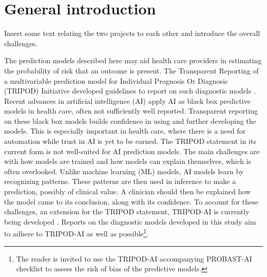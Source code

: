 \chapter{General introduction}\label{ch:general_introduction}

Insert some text relating the two projects to each other and introduce the overall challenges.

The prediction models described here may aid health care providers in estimating the probability of risk that an outcome is present.
The Transparent Reporting of a multivariable prediction model for Individual Prognosis Or Diagnosis (TRIPOD) Initiative developed guidelines to report on such diagnostic models \cite{Collins2015, Moons2015}.
Recent advances in artificial intelligence (AI) apply AI as black box predictive models in health care, often not sufficiently well reported.
Transparent reporting on these black box models builds confidence in using and further developing the models.
This is especially important in health care, where there is a need for automation while trust in AI is yet to be earned.
The TRIPOD statement in its current form is not well-suited for AI prediction models.
The main challenges are with how models are trained and how models can explain themselves, which is often overlooked.
Unlike machine learning (ML) models, AI models learn by recognizing patterns.
These patterns are then used in inference to make a prediction, possibly of clinical value.
A clinician should then be explained how the model came to its conclusion, along with its confidence.
To account for these challenges, an extension for the TRIPOD statement, TRIPOD-AI is currently being developed \cite{Collins2021,Collins2020}.
Reports on the diagnostic models developed in this study aim to adhere to TRIPOD-AI as well as possible\footnote{The reader is invited to use the TRIPOD-AI accompanying PROBAST-AI \cite{Wolff2019a, Wolff2019b, Collins2021} checklist to assess the risk of bias of the predictive models.}.
